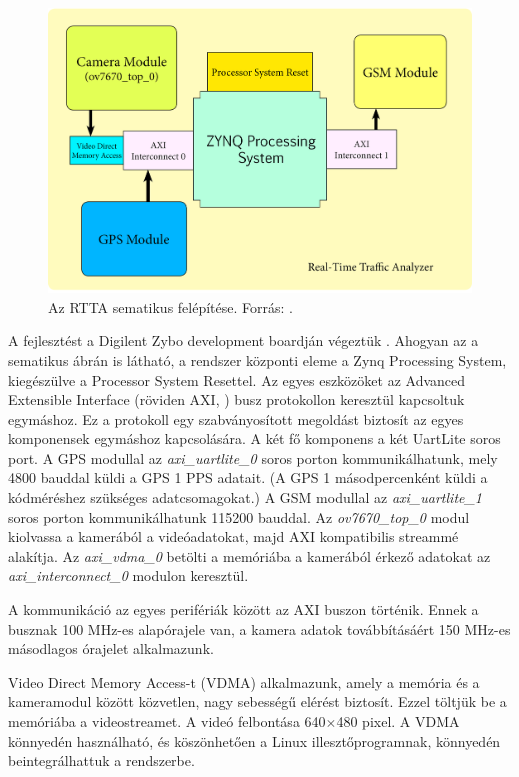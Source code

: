 \documentclass[a4paper,12pt]{report}
\begin{document}
\begin{figure}[h]
\centerline{
\includegraphics[width=6in]{img/sema}}
\caption{Az RTTA sematikus felépítése. Forrás: \cite{usingcoginfocom}.}
\label{rttaschema}
\end{figure}  

A fejlesztést a Digilent Zybo development boardján végeztük \cite{zybo}. Ahogyan az a sematikus ábrán is látható, a rendszer központi eleme a Zynq Processing System, kiegészülve a Processor System Resettel. Az egyes eszközöket az Advanced Extensible Interface (röviden AXI, \cite{xilinx1999reference}) busz protokollon keresztül kapcsoltuk egymáshoz. Ez a protokoll egy szabványosított megoldást biztosít az egyes komponensek egymáshoz kapcsolására. A két fő komponens a két UartLite soros port. A GPS modullal az \emph{axi\_uartlite\_0} soros porton kommunikálhatunk, mely 4800 bauddal küldi a GPS 1 PPS adatait. (A GPS 1 másodpercenként küldi a kódméréshez szükséges adatcsomagokat.) A GSM modullal az \emph{axi\_uartlite\_1} soros porton kommunikálhatunk 115200 bauddal. Az \emph{ov7670\_top\_0} modul kiolvassa a kamerából a videóadatokat, majd AXI kompatibilis streammé alakítja. Az \emph{axi\_vdma\_0} betölti a memóriába a kamerából érkező adatokat az \emph{axi\_interconnect\_0} modulon keresztül.

A kommunikáció az egyes perifériák között az AXI buszon történik. Ennek a busznak 100 MHz-es alapórajele van, a kamera adatok továbbításáért 150 MHz-es másodlagos órajelet alkalmazunk.

Video Direct Memory Access-t (VDMA) alkalmazunk, amely a memória és a kameramodul között közvetlen, nagy sebességű elérést biztosít. Ezzel töltjük be a memóriába a videostreamet. A videó felbontása 640$\times$480 pixel. A VDMA könnyedén használható, és köszönhetően a Linux illesztőprogramnak, könnyedén beintegrálhattuk a rendszerbe.
\end{document}
